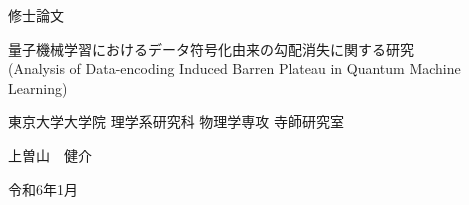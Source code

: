 \begin{titlepage}
    \begin{center}        
        \vspace*{3cm}
        
        {\Large 修士論文}
        \vspace{5cm}
 
        {\Large 量子機械学習におけるデータ符号化由来の勾配消失に関する研究\\}
        \vspace{0.5cm}
        {\fontsize{15pt}{0cm}\selectfont (Analysis of Data-encoding Induced Barren Plateau in Quantum Machine Learning)}
        
        \vspace{5cm}
        
        \vfill
        
        {\large 東京大学大学院 理学系研究科 物理学専攻 寺師研究室}
        
        \vspace{0.5cm}
        {\Large 上曽山　健介}
        
        \vspace{1cm}
        {\Large 令和6年1月}
        
    \end{center}
\end{titlepage}
\restoregeometry